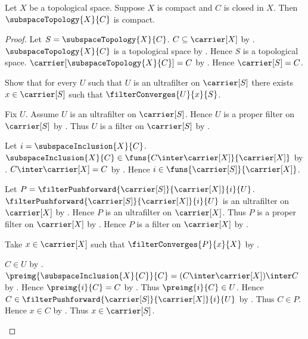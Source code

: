 \begin{theorem}\label{closed_subspace_of_compact_is_compact}
    Let $X$ be a topological space.
    Suppose $X$ is compact and $C$ is closed in $X$.
    Then $\subspaceTopology{X}{C}$ is compact.
\end{theorem}
\begin{proof}
    Let $S=\subspaceTopology{X}{C}$.
    $C\subseteq\carrier[X]$ by .
    $\subspaceTopology{X}{C}$ is a topological space by
        .
    Hence $S$ is a topological space.
    $\carrier[\subspaceTopology{X}{C}]=C$ by
        .
    Hence $\carrier[S]=C$.

    Show that for every $U$ such that
        $U$ is an ultrafilter on $\carrier[S]$ there exists
        $x\in\carrier[S]$ such that $\filterConverges{U}{x}{S}$.
    \begin{subproof}
        Fix $U$.
        Assume $U$ is an ultrafilter on $\carrier[S]$.
        Hence $U$ is a proper filter on $\carrier[S]$ by
            .
        Thus $U$ is a filter on $\carrier[S]$ by
            .

        Let $i=\subspaceInclusion{X}{C}$.
        $\subspaceInclusion{X}{C}\in
            \funs{C\inter\carrier[X]}{\carrier[X]}$ by
            .
        $C\inter\carrier[X]=C$ by
            .
        Hence $i\in\funs{\carrier[S]}{\carrier[X]}$.

        Let $P=\filterPushforward{\carrier[S]}{\carrier[X]}{i}{U}$.
        $\filterPushforward{\carrier[S]}{\carrier[X]}{i}{U}$ is an
            ultrafilter on $\carrier[X]$ by
            .
        Hence $P$ is an ultrafilter on $\carrier[X]$.
        Thus $P$ is a proper filter on $\carrier[X]$ by
            .
        Hence $P$ is a filter on $\carrier[X]$ by
            .

        Take $x\in\carrier[X]$ such that
            $\filterConverges{P}{x}{X}$ by
            .

        $C\in U$ by .
        $\preimg{\subspaceInclusion{X}{C}}{C}
            =(C\inter\carrier[X])\inter C$ by
            .
        Hence $\preimg{i}{C}=C$ by
            .
        Thus $\preimg{i}{C}\in U$.
        Hence $C\in
            \filterPushforward{\carrier[S]}{\carrier[X]}{i}{U}$ by
            .
        Thus $C\in P$.
        Hence $x\in C$ by
            .
        Thus $x\in\carrier[S]$.


\end{subproof}
\end{proof}
